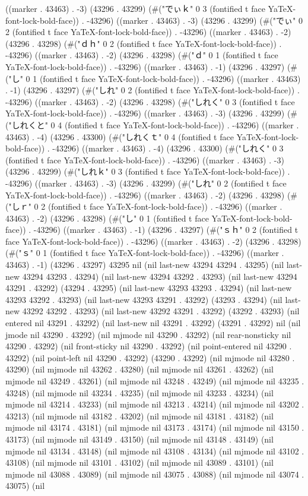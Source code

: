 ((marker . 43463) . -3) (43296 . 43299) (#("でぃｋ" 0 3 (fontified t face YaTeX-font-lock-bold-face)) . -43296) ((marker . 43463) . -3) (43296 . 43299) (#("でぃ" 0 2 (fontified t face YaTeX-font-lock-bold-face)) . -43296) ((marker . 43463) . -2) (43296 . 43298) (#("ｄｈ" 0 2 (fontified t face YaTeX-font-lock-bold-face)) . -43296) ((marker . 43463) . -2) (43296 . 43298) (#("ｄ" 0 1 (fontified t face YaTeX-font-lock-bold-face)) . -43296) ((marker . 43463) . -1) (43296 . 43297) (#("し" 0 1 (fontified t face YaTeX-font-lock-bold-face)) . -43296) ((marker . 43463) . -1) (43296 . 43297) (#("しれ" 0 2 (fontified t face YaTeX-font-lock-bold-face)) . -43296) ((marker . 43463) . -2) (43296 . 43298) (#("しれく" 0 3 (fontified t face YaTeX-font-lock-bold-face)) . -43296) ((marker . 43463) . -3) (43296 . 43299) (#("しれくと" 0 4 (fontified t face YaTeX-font-lock-bold-face)) . -43296) ((marker . 43463) . -4) (43296 . 43300) (#("しれくｔ" 0 4 (fontified t face YaTeX-font-lock-bold-face)) . -43296) ((marker . 43463) . -4) (43296 . 43300) (#("しれく" 0 3 (fontified t face YaTeX-font-lock-bold-face)) . -43296) ((marker . 43463) . -3) (43296 . 43299) (#("しれｋ" 0 3 (fontified t face YaTeX-font-lock-bold-face)) . -43296) ((marker . 43463) . -3) (43296 . 43299) (#("しれ" 0 2 (fontified t face YaTeX-font-lock-bold-face)) . -43296) ((marker . 43463) . -2) (43296 . 43298) (#("しｒ" 0 2 (fontified t face YaTeX-font-lock-bold-face)) . -43296) ((marker . 43463) . -2) (43296 . 43298) (#("し" 0 1 (fontified t face YaTeX-font-lock-bold-face)) . -43296) ((marker . 43463) . -1) (43296 . 43297) (#("ｓｈ" 0 2 (fontified t face YaTeX-font-lock-bold-face)) . -43296) ((marker . 43463) . -2) (43296 . 43298) (#("ｓ" 0 1 (fontified t face YaTeX-font-lock-bold-face)) . -43296) ((marker . 43463) . -1) (43296 . 43297) 43295 nil (nil last-new 43294 43294 . 43295) (nil last-new 43294 43293 . 43294) (nil last-new 43294 43292 . 43293) (nil last-new 43294 43291 . 43292) (43294 . 43295) (nil last-new 43293 43293 . 43294) (nil last-new 43293 43292 . 43293) (nil last-new 43293 43291 . 43292) (43293 . 43294) (nil last-new 43292 43292 . 43293) (nil last-new 43292 43291 . 43292) (43292 . 43293) (nil entered nil 43291 . 43292) (nil last-new nil 43291 . 43292) (43291 . 43292) nil (nil jmode nil 43290 . 43292) (nil mjmode nil 43290 . 43292) (nil rear-nonsticky nil 43290 . 43292) (nil front-sticky nil 43290 . 43292) (nil point-entered nil 43290 . 43292) (nil point-left nil 43290 . 43292) (43290 . 43292) (nil mjmode nil 43280 . 43290) (nil mjmode nil 43262 . 43280) (nil mjmode nil 43261 . 43262) (nil mjmode nil 43249 . 43261) (nil mjmode nil 43248 . 43249) (nil mjmode nil 43235 . 43248) (nil mjmode nil 43234 . 43235) (nil mjmode nil 43233 . 43234) (nil mjmode nil 43214 . 43233) (nil mjmode nil 43213 . 43214) (nil mjmode nil 43202 . 43213) (nil mjmode nil 43182 . 43202) (nil mjmode nil 43181 . 43182) (nil mjmode nil 43174 . 43181) (nil mjmode nil 43173 . 43174) (nil mjmode nil 43150 . 43173) (nil mjmode nil 43149 . 43150) (nil mjmode nil 43148 . 43149) (nil mjmode nil 43134 . 43148) (nil mjmode nil 43108 . 43134) (nil mjmode nil 43102 . 43108) (nil mjmode nil 43101 . 43102) (nil mjmode nil 43089 . 43101) (nil mjmode nil 43088 . 43089) (nil mjmode nil 43075 . 43088) (nil mjmode nil 43074 . 43075) (nil 